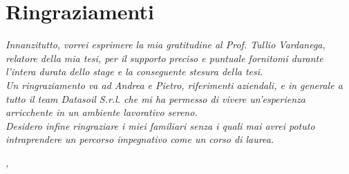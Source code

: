 
\cleardoublepage
{}
{}

\bigskip

\begingroup
\let\clearpage\relax
\let\cleardoublepage\relax
\let\cleardoublepage\relax

\chapter*{Ringraziamenti}

\noindent \textit{Innanzitutto, vorrei esprimere la mia gratitudine al Prof. Tullio Vardanega, relatore della mia tesi, per il supporto preciso e puntuale fornitomi durante l'intera durata dello stage e la conseguente stesura della tesi.}\\

\noindent \textit{Un ringraziamento va ad Andrea e Pietro, riferimenti aziendali, e in generale a tutto il team Datasoil S.r.l. che mi ha permesso di vivere un'esperienza arricchente in un ambiente lavorativo sereno.}\\

\noindent \textit{Desidero infine ringraziare i miei familiari senza i quali mai avrei potuto intraprendere un percorso impegnativo come un corso di laurea.}\\


\bigskip

\noindent\textit{\myLocation, \myTime}
\hfill \myName

\endgroup

